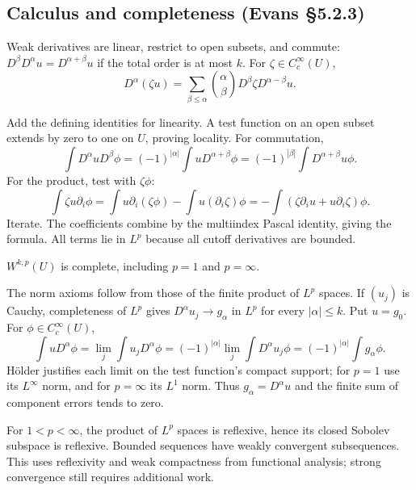 \subsection{Calculus and completeness (Evans \S5.2.3)}
\begin{theorem}
Weak derivatives are linear, restrict to open subsets, and commute:
$D^\beta D^\alpha u=D^{\alpha+\beta}u$ if the total order is at most $k$.
For $\zeta\in C_c^\infty(U)$,
\[
 D^\alpha(\zeta u)=\sum_{\beta\leq\alpha}
 {\alpha\choose\beta}D^\beta\zeta D^{\alpha-\beta}u.
\]
\end{theorem}
\begin{expandedproof}
Add the defining identities for linearity. A test function on an open
subset extends by zero to one on $U$, proving locality. For commutation,
\[
 \int D^\alpha uD^\beta\phi
 =(-1)^{|\alpha|}\int uD^{\alpha+\beta}\phi
 =(-1)^{|\beta|}\int D^{\alpha+\beta}u\phi.
\]
For the product, test with $\zeta\phi$:
\[
 \int\zeta u\partial_i\phi
 =\int u\partial_i(\zeta\phi)-\int u(\partial_i\zeta)\phi
 =-\int(\zeta\partial_i u+u\partial_i\zeta)\phi.
\]
Iterate. The coefficients combine by the multiindex Pascal identity,
giving the formula. All terms lie in $L^p$ because all cutoff derivatives
are bounded.
\end{expandedproof}

\begin{theorem}\label{thm:5-completeness}
$W^{k,p}(U)$ is complete, including $p=1$ and $p=\infty$.
\end{theorem}
\begin{expandedproof}
The norm axioms follow from those of the finite product of $L^p$ spaces.
If $(u_j)$ is Cauchy, completeness of $L^p$ gives
$D^\alpha u_j\to g_\alpha$ in $L^p$ for every $|\alpha|\leq k$.
Put $u=g_0$. For $\phi\in C_c^\infty(U)$,
\[
 \int uD^\alpha\phi
 =\lim_j\int u_jD^\alpha\phi
 =(-1)^{|\alpha|}\lim_j\int D^\alpha u_j\phi
 =(-1)^{|\alpha|}\int g_\alpha\phi.
\]
H\"older justifies each limit on the test function's compact support;
for $p=1$ use its $L^\infty$ norm, and for $p=\infty$ its $L^1$ norm.
Thus $g_\alpha=D^\alpha u$ and the finite sum of component errors tends
to zero.
\end{expandedproof}
\Needspace{45mm}
For $1<p<\infty$, the product of $L^p$ spaces is reflexive, hence its
closed Sobolev subspace is reflexive. Bounded sequences have weakly
convergent subsequences. This uses reflexivity and weak compactness from
functional analysis; strong convergence still requires additional work.
